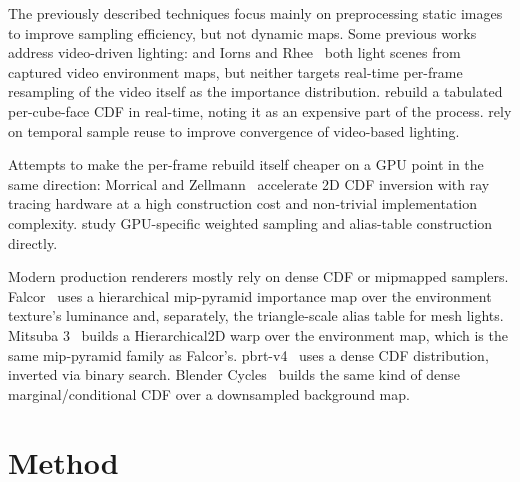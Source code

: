 \documentclass[acmtog,review,anonymous]{acmart}
\begin{document}
The previously described techniques focus mainly on preprocessing static images to improve sampling efficiency, but not dynamic maps. Some previous works address video-driven lighting: \cite{havran2005interactive} and Iorns and Rhee~\cite{iorns2015realtime} both light scenes from captured video environment maps, but neither targets real-time per-frame
resampling of the video itself as the importance distribution. \cite{lu2013realtime} rebuild a tabulated per-cube-face CDF in real-time, noting it as an expensive part of the process. \cite{kronander2014real} rely on temporal sample reuse to improve convergence of video-based lighting. 

Attempts to make the per-frame rebuild itself cheaper on a GPU point in the same direction: Morrical and Zellmann~\cite{morrical2021inverse} accelerate 2D CDF
inversion with ray tracing hardware at a high construction cost and non-trivial implementation
complexity. \cite{lehmann2021weighted} study GPU-specific weighted sampling and alias-table construction directly. 

Modern production renderers mostly rely on dense CDF or mipmapped samplers. {Falcor}~\cite{falcorsoftware} uses a hierarchical mip-pyramid importance map over the environment texture's luminance and, separately,
the triangle-scale alias table for mesh lights. {Mitsuba 3}~\cite{nimierdavid2019mitsuba2} builds a {Hierarchical2D} warp over
the environment map, which is the same mip-pyramid family as Falcor's. {pbrt-v4}~\cite{pharr2023pbrt}
uses a dense CDF distribution, inverted via binary search. {Blender Cycles}~\cite{cyclessoftware} builds the same
kind of dense marginal/conditional CDF over a downsampled background map. 

\section{Method}\label{sec:method}
\end{document}
